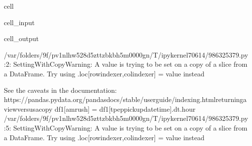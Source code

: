 \documentclass[letterpaper,10pt,english]{sphinxmanual}
\begin{document}
\begin{sphinxuseclass}{cell}
\begin{sphinxuseclass}{cell_input}
\begin{sphinxVerbatim}[commandchars=\\\{\}]
\PYG{p}{[}\PYG{p}{]}  \PYG{p}{[}\PYG{p}{]}

\PYG{p}{[}\PYG{p}{]}  \PYG{p}{[}\PYG{p}{]}

\PYG{p}{[}\PYG{p}{]}  \PYG{p}{[}\PYG{p}{]}

\PYG{p}{[}\PYG{p}{]}  \PYG{p}{[}\PYG{p}{]}
\end{sphinxVerbatim}

\end{sphinxuseclass}
\begin{sphinxuseclass}{cell_output}
\begin{sphinxVerbatim}[commandchars=\\\{\}]
/var/folders/9f/pv1nlhw528d\PYGZus{}5zttzbkb\PYGZus{}h5m0000gn/T/ipykernel\PYGZus{}70614/986325379.py:2: SettingWithCopyWarning: 
A value is trying to be set on a copy of a slice from a DataFrame.
Try using .loc[row\PYGZus{}indexer,col\PYGZus{}indexer] = value instead

See the caveats in the documentation: https://pandas.pydata.org/pandas\PYGZhy{}docs/stable/user\PYGZus{}guide/indexing.html\PYGZsh{}returning\PYGZhy{}a\PYGZhy{}view\PYGZhy{}versus\PYGZhy{}a\PYGZhy{}copy
  df1[\PYGZsq{}am\PYGZus{}rush\PYGZsq{}] = df1[\PYGZsq{}tpep\PYGZus{}pickup\PYGZus{}datetime\PYGZsq{}].dt.hour
/var/folders/9f/pv1nlhw528d\PYGZus{}5zttzbkb\PYGZus{}h5m0000gn/T/ipykernel\PYGZus{}70614/986325379.py:5: SettingWithCopyWarning: 
A value is trying to be set on a copy of a slice from a DataFrame.
Try using .loc[row\PYGZus{}indexer,col\PYGZus{}indexer] = value instead


\end{sphinxVerbatim}
\end{sphinxuseclass}
\end{sphinxuseclass}
\end{document}
